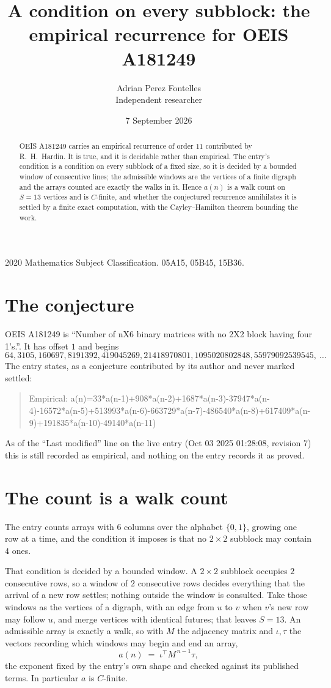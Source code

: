 \documentclass[11pt,a4paper]{article}
\title{A condition on every subblock: the empirical recurrence for OEIS A181249}
\author{Adrian Perez Fontelles\\ \small Independent researcher}
\date{7 September 2026}
\theoremstyle{plain}
\theoremstyle{definition}
\begin{document}
\maketitle

\begin{abstract}
OEIS A181249 carries an empirical recurrence of order $11$ contributed by R.~H.~Hardin. It is
true, and it is decidable rather than empirical. The entry's condition is a condition on every
subblock of a fixed size, so it is decided by a bounded window of consecutive lines; the
admissible windows are the vertices of a finite digraph and the arrays counted are exactly the
walks in it. Hence $a(n)$ is a walk count on $S=13$ vertices and is $C$-finite, and whether the
conjectured recurrence annihilates it is settled by a finite exact computation, with the
Cayley--Hamilton theorem bounding the work.
\end{abstract}

\noindent\small 2020 Mathematics Subject Classification. 05A15, 05B45, 15B36.\normalsize

\section{The conjecture}

OEIS A181249 is ``Number of nX6 binary matrices with no 2X2 block having four 1's.''. It has offset $1$ and begins
\[
64, 3105, 160697, 8191392, 419045269, 21418970801, 1095020802848, 55979092539545,\ \dots
\]
The entry states, as a conjecture contributed by its author and never marked settled:
\begin{quote}
Empirical: a(n)=33*a(n-1)+908*a(n-2)+1687*a(n-3)-37947*a(n-4)-16572*a(n-5)+513993*a(n-6)-663729*a(n-7)-486540*a(n-8)+617409*a(n-9)+191835*a(n-10)-49140*a(n-11)
\end{quote}
As of the ``Last modified'' line on the live entry (Oct 03 2025 01:28:08, revision 7) this is still
recorded as empirical, and nothing on the entry records it as proved.

\section{The count is a walk count}

The entry counts arrays with $6$ columns over the alphabet $\{0,1\}$, growing one row at a time, and the condition it imposes is that no $2\times2$ subblock may contain $4$ ones.

That condition is decided by a bounded window. A $2\times2$ subblock occupies $2$ consecutive rows, so a window of $2$ consecutive rows decides everything that the arrival of a new row settles; nothing outside the window is consulted. Take those windows as the vertices of a digraph, with an edge from $u$ to $v$ when $v$'s new row may follow $u$, and merge vertices with identical futures; that leaves $S=13$. An admissible array is exactly a walk, so with $M$ the adjacency matrix and $\iota,\tau$ the vectors recording which windows may begin and end an array,
\[
a(n)\;=\;\iota^{\!\top}M^{\,n-1}\tau ,
\]
the exponent fixed by the entry's own shape and checked against its published terms. In
particular $a$ is $C$-finite.
\end{document}
